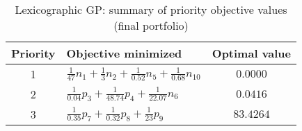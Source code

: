 \begin{table}[htbp]
\centering
\caption{Lexicographic GP: summary of priority objective values (final portfolio)}
\label{tab:lgpPriorityObjectives}
\begin{tabular}{clc}
\hline
\textbf{Priority} & \textbf{Objective minimized} & \textbf{Optimal value} \\
\hline
1 & $\frac{1}{47}n_1+\frac{1}{3}n_2+\frac{1}{0.52}n_5+\frac{1}{0.68}n_{10}$ & $0.0000$ \\
2 & $\frac{1}{0.04}p_3+\frac{1}{48.74}p_4+\frac{1}{22.07}n_6$               & $0.0416$ \\
3 & $\frac{1}{0.35}p_7+\frac{1}{0.32}p_8+\frac{1}{23}p_9$                    & $83.4264$ \\
\hline
\end{tabular}
\end{table}
